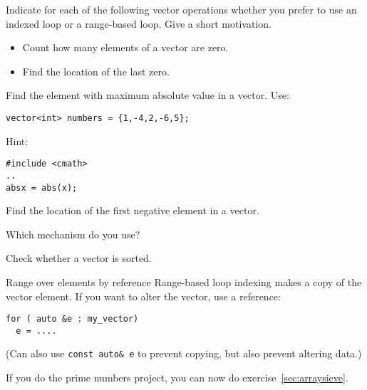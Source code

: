 \begin{exercise}
  \label{ex:range-for}
  Indicate for each of the following vector operations whether you
  prefer to use an indexed loop or a range-based loop. Give a short
  motivation.
  \begin{itemize}
  \item Count how many elements of a vector are zero.
  \item Find the location of the last zero.
  \end{itemize}
\end{exercise}

\begin{exercise}
  \label{ex:array-max}
  Find the element with maximum absolute value in a vector. Use:
\begin{lstlisting}
vector<int> numbers = {1,-4,2,-6,5};
\end{lstlisting}

Hint:
\begin{lstlisting}
#include <cmath>
..
absx = abs(x);
\end{lstlisting}
\end{exercise}

\begin{exercise}
  \label{ex:array-maxidx}
  Find the location of the first negative element in a vector.

  Which mechanism do you use?
\end{exercise}

\begin{exercise}
  \label{ex:array-sorted}
  Check whether a vector is sorted.
\end{exercise}

\begin{block}{Range over elements by reference}
  \label{sl:array-range-ref}
  Range-based loop indexing makes a copy of the vector element. If you
  want to alter the vector, use a reference:
\begin{lstlisting}
for ( auto &e : my_vector)
  e = ....
\end{lstlisting}
%

(Can also use \lstinline{const auto& e} to prevent copying, but also
prevent altering data.)
\end{block}

\begin{exercise}
  If you do the prime numbers project, you can now do exercise~\ref{sec:arraysieve}.
\end{exercise}

